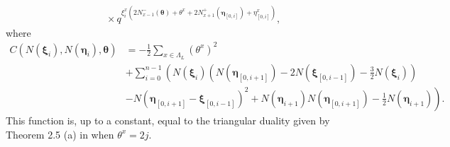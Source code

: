 \documentclass{ximera}
\begin{document}
\begin{remark}
\begin{align*}
  &\quad\times q^{\xi_i^x\left(2N_{x-1}^-(\boldsymbol{\theta})+\theta^x+2N_{x+1}^+(\boldsymbol{\eta}_{[0,i]})+\eta^x_{[0,i]}\right)},
\end{align*}
where 
\begin{align*}
C(N(\boldsymbol\xi_i),N(\boldsymbol\eta_i),\boldsymbol\theta)&= -\frac{1}{2}\sum_{x\in\Lambda_L}\left(\theta^x\right)^2\\
&+\sum_{i=0}^{n-1}\left(N(\boldsymbol\xi_i)\left(N(\boldsymbol\eta_{[0,i+1]})-2N(\boldsymbol\xi_{[0,i-1]})-\frac{3}{2}N(\boldsymbol\xi_i)\right)\right.\\
&\left.-N(\boldsymbol\eta_{[0,i+1]}-\boldsymbol\xi_{[0,i-1]})^2+N(\boldsymbol\eta_{i+1})N(\boldsymbol\eta_{[0,i+1]})-\frac{1}{2}N(\boldsymbol\eta_{i+1})\right).
\end{align*}
This function is, up to a constant, equal to the triangular duality given by Theorem 2.5 (a) in \cite{Kuan-IMRN} when $\theta^x=2j$.
\end{remark}
\end{document}
